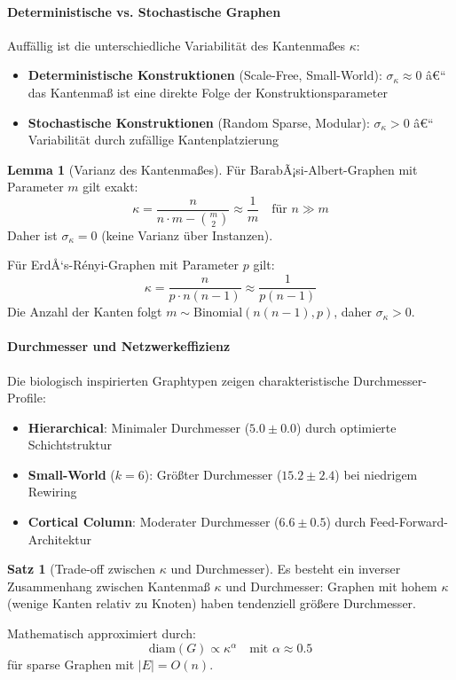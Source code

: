 ﻿\documentclass[a4paper,12pt]{article}
\theoremstyle{definition}
\newtheorem{satz}{Satz}
\newtheorem{lemma}{Lemma}
\begin{document}
	\paragraph{Deterministische vs. Stochastische Graphen}
	
	Auffällig ist die unterschiedliche Variabilität des Kantenmaßes $\kappa$:
	
	\begin{itemize}
		\item[-] \textbf{Deterministische Konstruktionen} (Scale-Free, Small-World): $\sigma_\kappa \approx 0$ â€“ das Kantenmaß ist eine direkte Folge der Konstruktionsparameter
		\item[-] \textbf{Stochastische Konstruktionen} (Random Sparse, Modular): $\sigma_\kappa > 0$ â€“ Variabilität durch zufällige Kantenplatzierung
	\end{itemize}
	
	\begin{lemma}[Varianz des Kantenmaßes]
		Für BarabÃ¡si-Albert-Graphen mit Parameter $m$ gilt exakt:
		\[
		\kappa = \frac{n}{n \cdot m - \binom{m}{2}} \approx \frac{1}{m} \quad \text{für } n \gg m
		\]
		Daher ist $\sigma_\kappa = 0$ (keine Varianz über Instanzen).
		
		Für ErdÅ‘s-Rényi-Graphen mit Parameter $p$ gilt:
		\[
		\kappa = \frac{n}{p \cdot n(n-1)} \approx \frac{1}{p(n-1)}
		\]
		Die Anzahl der Kanten folgt $m \sim \text{Binomial}(n(n-1), p)$, daher $\sigma_\kappa > 0$.
	\end{lemma}
	
	\paragraph{Durchmesser und Netzwerkeffizienz}
	
	Die biologisch inspirierten Graphtypen zeigen charakteristische Durchmesser-Profile:
	
	\begin{itemize}
		\item[-] \textbf{Hierarchical}: Minimaler Durchmesser ($5.0 \pm 0.0$) durch optimierte Schichtstruktur
		\item[-] \textbf{Small-World} ($k=6$): Größter Durchmesser ($15.2 \pm 2.4$) bei niedrigem Rewiring
		\item[-] \textbf{Cortical Column}: Moderater Durchmesser ($6.6 \pm 0.5$) durch Feed-Forward-Architek\-tur
	\end{itemize}
	
	\begin{satz}[Trade-off zwischen $\kappa$ und Durchmesser]
		Es besteht ein inverser Zusammenhang zwischen Kantenmaß $\kappa$ und Durchmesser: Graphen mit hohem $\kappa$ (wenige Kanten relativ zu Knoten) haben tendenziell größere Durchmesser.
		
		Mathematisch approximiert durch:
		\[
		\text{diam}(G) \propto \kappa^\alpha \quad \text{mit } \alpha \approx 0.5
		\]
		für sparse Graphen mit $|E| = O(n)$.
	\end{satz}
	
\end{document}
